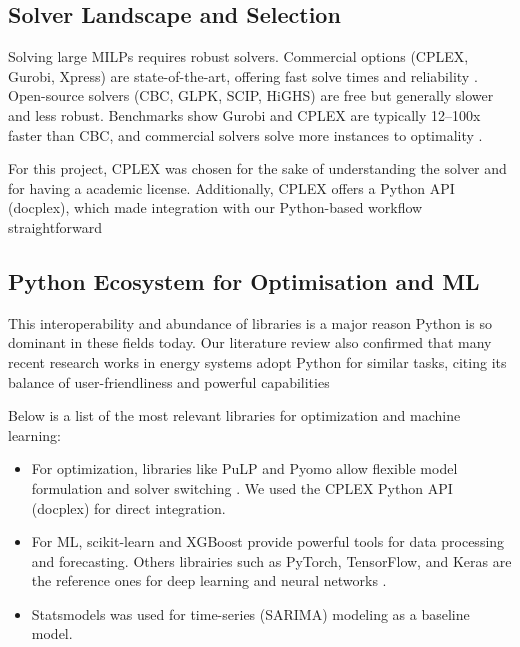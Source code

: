 \subsection{Solver Landscape and Selection}
Solving large MILPs requires robust solvers. Commercial options (CPLEX, Gurobi, Xpress) are 
state-of-the-art, offering fast solve times and reliability \cite{mitchell2011pulp, forrest2018cbc}. 
Open-source solvers (CBC, GLPK, SCIP, HiGHS) are free but generally slower and less robust. 
Benchmarks show Gurobi and CPLEX are typically 12--100x faster than CBC, and commercial solvers 
solve more instances to optimality \cite{mittelmann2023benchmarks}.

For this project, CPLEX was chosen for the sake of understanding the solver and for having a 
academic license. Additionally, CPLEX offers a Python API (docplex), which made integration with 
our Python-based workflow straightforward

\subsection{Python Ecosystem for Optimisation and ML}
This interoperability and abundance of libraries is a major reason Python is so dominant in these 
fields today. Our literature review also confirmed that many recent research works in energy systems 
adopt Python for similar tasks, citing its balance of user-friendliness and powerful capabilities

Below is a list of the most relevant libraries for optimization and machine learning:

\begin{itemize}
    \item For optimization, libraries like PuLP and Pyomo allow flexible model formulation and 
    solver switching \cite{mitchell2011pulp}. We used the CPLEX Python API (docplex) for direct 
    integration. 
    \item For ML, scikit-learn and XGBoost provide powerful tools for data processing and 
    forecasting. Others librairies such as PyTorch, TensorFlow, and Keras are the reference ones 
    for deep learning and neural networks \cite{scikit-learn}. 
    \item Statsmodels was used for time-series (SARIMA) modeling as a baseline model.
\end{itemize}

\newpage